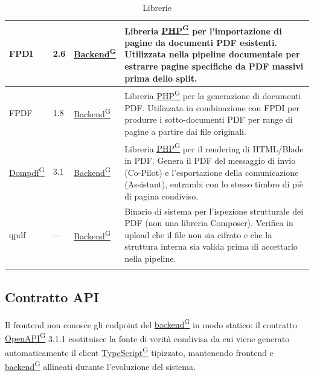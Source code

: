 \documentclass[a4paper,12pt]{article}
\providecommand{\glslink}[2]{\href{https://alittlebyte-19.github.io/Documentazione/glossario.html\#gls-#1}{\underline{#2}\textsuperscript{\scriptsize G}}}
\begin{document}
{\begin{longtable}{|p{3cm}|p{1.8cm}|p{2cm}|p{7.7cm}|}
    \hline
    FPDI & 2.6 & \glslink{backend}{Backend} & Libreria \glslink{php}{PHP} per l'importazione di pagine da documenti PDF esistenti. Utilizzata nella pipeline documentale per estrarre pagine specifiche da PDF massivi prima dello split. \\
    \hline
    FPDF & 1.8 & \glslink{backend}{Backend} & Libreria \glslink{php}{PHP} per la generazione di documenti PDF. Utilizzata in combinazione con FPDI per produrre i sotto-documenti PDF per range di pagine a partire dai file originali. \\
    \hline
    \glslink{dompdf}{Dompdf} & 3.1 & \glslink{backend}{Backend} & Libreria \glslink{php}{PHP} per il rendering di HTML/Blade in PDF. Genera il PDF del messaggio di invio (Co-Pilot) e l'esportazione della comunicazione (Assistant), entrambi con lo stesso timbro di piè di pagina condiviso. \\
    \hline
    qpdf & --- & \glslink{backend}{Backend} & Binario di sistema per l'ispezione strutturale dei PDF (non una libreria Composer). Verifica in upload che il file non sia cifrato e che la struttura interna sia valida prima di accettarlo nella pipeline. \\
    \hline
    \caption{Librerie}
\end{longtable}
}

\subsection{Contratto API}

Il frontend non conosce gli endpoint del \glslink{backend}{backend} in modo statico: il contratto \glslink{openapi}{OpenAPI} 3.1.1 costituisce la fonte di verità condivisa da cui viene generato automaticamente il client \glslink{typescript}{TypeScript} tipizzato, mantenendo frontend e \glslink{backend}{backend} allineati durante l'evoluzione del sistema.
\end{document}
